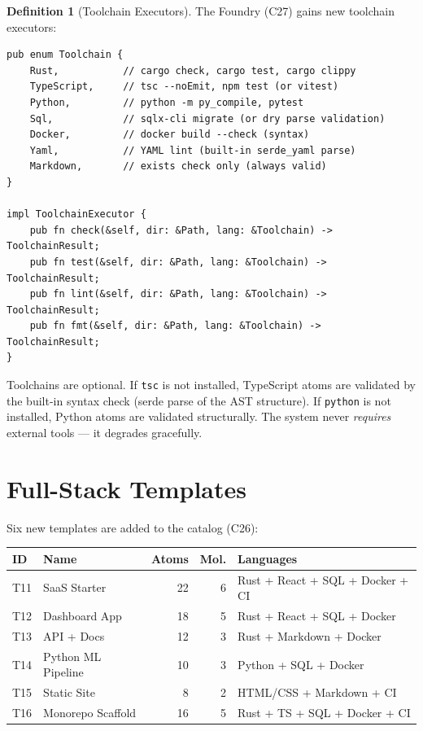 \documentclass[11pt,a4paper,twoside]{article}
\theoremstyle{definition}
\newtheorem{definition}{Definition}[section]
\theoremstyle{plain}
\theoremstyle{remark}
\begin{document}
\begin{definition}[Toolchain Executors]\label{def:toolchains}
The Foundry (C27) gains new toolchain executors:
\begin{lstlisting}
pub enum Toolchain {
    Rust,           // cargo check, cargo test, cargo clippy
    TypeScript,     // tsc --noEmit, npm test (or vitest)
    Python,         // python -m py_compile, pytest
    Sql,            // sqlx-cli migrate (or dry parse validation)
    Docker,         // docker build --check (syntax)
    Yaml,           // YAML lint (built-in serde_yaml parse)
    Markdown,       // exists check only (always valid)
}

impl ToolchainExecutor {
    pub fn check(&self, dir: &Path, lang: &Toolchain) -> ToolchainResult;
    pub fn test(&self, dir: &Path, lang: &Toolchain) -> ToolchainResult;
    pub fn lint(&self, dir: &Path, lang: &Toolchain) -> ToolchainResult;
    pub fn fmt(&self, dir: &Path, lang: &Toolchain) -> ToolchainResult;
}
\end{lstlisting}

Toolchains are optional. If \texttt{tsc} is not installed, TypeScript
atoms are validated by the built-in syntax check (serde parse of the
AST structure). If \texttt{python} is not installed, Python atoms are
validated structurally. The system never \emph{requires} external
tools --- it degrades gracefully.
\end{definition}


\section{Full-Stack Templates}\label{sec:ml:templates}

Six new templates are added to the catalog (C26):

\begin{tabularx}{\textwidth}{l l r r X}
\toprule
\textbf{ID} & \textbf{Name} & \textbf{Atoms} & \textbf{Mol.} &
  \textbf{Languages} \\
\midrule
T11 & SaaS Starter & 22 & 6 & Rust + React + SQL + Docker + CI \\
T12 & Dashboard App & 18 & 5 & Rust + React + SQL + Docker \\
T13 & API + Docs & 12 & 3 & Rust + Markdown + Docker \\
T14 & Python ML Pipeline & 10 & 3 & Python + SQL + Docker \\
T15 & Static Site & 8 & 2 & HTML/CSS + Markdown + CI \\
T16 & Monorepo Scaffold & 16 & 5 & Rust + TS + SQL + Docker + CI \\
\bottomrule
\end{tabularx}
\end{document}
